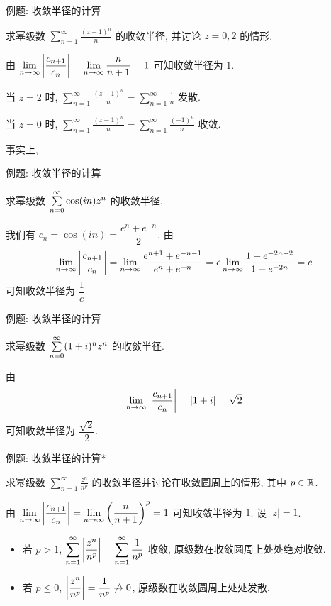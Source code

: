 \begin{frame}{例题: 收敛半径的计算}
\begin{example}
求幂级数 $\displaystyle\sum_{n=1}^\infty\frac{(z-1)^n}n$ 的收敛半径, 并讨论 $z=0,2$ 的情形.
\end{example}
\begin{solution}
由 $\displaystyle\lim_{n\to\infty}\left|\frac{c_{n+1}}{c_n}\right|=\lim_{n\to\infty}\frac n{n+1}=1$ 可知收敛半径为 $1$.

\onslide<+->
当 $z=2$ 时, $\displaystyle\sum_{n=1}^\infty\frac{(z-1)^n}n=\sum_{n=1}^\infty\frac1n$ 发散.

\onslide<+->
当 $z=0$ 时, $\displaystyle\sum_{n=1}^\infty\frac{(z-1)^n}n=\sum_{n=1}^\infty\frac{(-1)^n}n$ 收敛.
\end{solution}
\onslide<+->
事实上, .
\end{frame}


\begin{frame}{例题: 收敛半径的计算}
\begin{example}
求幂级数 $\sum\limits_{n=0}^\infty\cos(in)z^n$ 的收敛半径.
\end{example}
\begin{solution}
我们有 $c_n=\cos(in)=\dfrac{e^n+e^{-n}}2$.
\onslide<+->
由
\[\lim_{n\to\infty}\left|\frac{c_{n+1}}{c_n}\right|=\lim_{n\to\infty}\frac{e^{n+1}+e^{-n-1}}{e^n+e^{-n}}=e\lim_{n\to\infty}\frac{1+e^{-2n-2}}{1+e^{-2n}}=e\]
可知收敛半径为 $\dfrac1e$.
\end{solution}
\end{frame}


\begin{frame}{例题: 收敛半径的计算}
\begin{example}
求幂级数 $\sum\limits_{n=0}^\infty(1+i)^nz^n$ 的收敛半径.
\end{example}
\begin{solution}
由 
\[\lim_{n\to\infty}\left|\frac{c_{n+1}}{c_n}\right|=|1+i|=\sqrt2\] 可知收敛半径为 $\dfrac{\sqrt2}2$.
\end{solution}
\end{frame}


\begin{frame}{例题: 收敛半径的计算*}
\begin{example}
求幂级数 $\displaystyle\sum_{n=1}^\infty\frac{z^n}{n^p}$ 的收敛半径并讨论在收敛圆周上的情形, 其中 $p\in{\mathbb{R}}$.
\end{example}
\begin{solution}
由 $\displaystyle\lim_{n\to\infty}\left|\frac{c_{n+1}}{c_n}\right|=\lim_{n\to\infty}\left(\frac n{n+1}\right)^p=1$ 可知收敛半径为 $1$.
\onslide<+->
设 $|z|=1$.
\begin{itemize}
\item 若 $p>1$, $\displaystyle\sum_{n=1}^\infty\left|\frac{z^n}{n^p}\right|=\sum_{n=1}^\infty\frac1{n^p}$ 收敛,
\onslide<+->
原级数在收敛圆周上处处绝对收敛.
\item 若 $p\le 0$, $\left|\dfrac{z^n}{n^p}\right|=\dfrac1{n^p}\not\to0$,
\onslide<+->
原级数在收敛圆周上处处发散.
\end{itemize}
\end{solution}
\end{frame}


